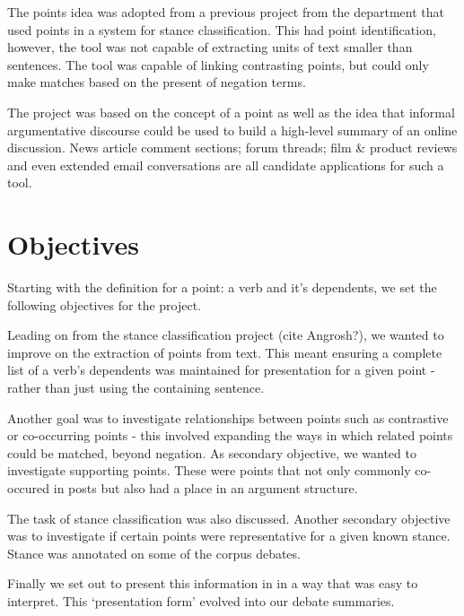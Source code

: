     The points idea was adopted from a previous project from the department that used points in a system for stance classification. This had point identification, however, the tool was not capable of extracting units of text smaller than sentences. The tool was capable of linking contrasting points, but could only make matches based on the present of negation terms.

    The project was based on the concept of a point as well as the idea that informal argumentative discourse could be used to build a high-level summary of an online discussion. News article comment sections; forum threads; film \& product reviews and even extended email conversations are all candidate applications for such a tool.

  \section{Objectives}
    Starting with the definition for a point: a verb and it's dependents, we set the following objectives for the project.

    Leading on from the stance classification project (cite Angrosh?), we wanted to improve on the extraction of points from text. This meant ensuring a complete list of a verb's dependents was maintained for presentation for a given point - rather than just using the containing sentence.

    Another goal was to investigate relationships between points such as contrastive or co-occurring points - this involved expanding the ways in which related points could be matched, beyond negation. As secondary objective, we wanted to investigate supporting points. These were points that not only commonly co-occured in posts but also had a place in an argument structure.

    The task of stance classification was also discussed. Another secondary objective was to investigate if certain points were representative for a given known stance. Stance was annotated on some of the corpus debates.

    Finally we set out to present this information in in a way that was easy to interpret. This `presentation form' evolved into our debate summaries.

